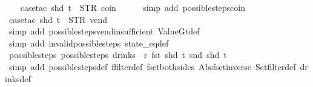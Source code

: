 \begin{isabellebody}
%
\isadelimproof
\ \ %
\endisadelimproof
%
\isatagproof
{}\isamarkupfalse%
\ {\isacharparenleft}case{\isacharunderscore}tac\ {\isachardoublequoteopen}shd\ t\ {\isacharequal}\ {\isacharparenleft}STR\ {\isacharprime}{\isacharprime}coin{\isacharprime}{\isacharprime}{\isacharcomma}\ {\isacharbrackleft}{\isacharbrackright}{\isacharparenright}{\isachardoublequoteclose}{\isacharparenright}\isanewline
\ \ \ \isamarkupfalse%
\ {\isacharparenleft}simp\ add{\isacharcolon}\ possible{\isacharunderscore}steps{\isacharunderscore}coin{\isacharparenright}\isanewline
\ \ \isamarkupfalse%
\ {\isacharparenleft}case{\isacharunderscore}tac\ {\isachardoublequoteopen}shd\ t\ {\isacharequal}\ {\isacharparenleft}STR\ {\isacharprime}{\isacharprime}vend{\isacharprime}{\isacharprime}{\isacharcomma}\ {\isacharbrackleft}{\isacharbrackright}{\isacharparenright}{\isachardoublequoteclose}{\isacharparenright}\isanewline
\ \ \ \isamarkupfalse%
\ {\isacharparenleft}simp\ add{\isacharcolon}\ possible{\isacharunderscore}steps{\isacharunderscore}vend{\isacharunderscore}insufficient\ ValueGt{\isacharunderscore}def{\isacharparenright}\isanewline
\ \ \isamarkupfalse%
\ {\isacharparenleft}simp\ add{\isacharcolon}\ invalid{\isacharunderscore}possible{\isacharunderscore}steps{\isacharunderscore}{}\ state_eq{\isacharunderscore}def{\isacharparenright}%
\endisatagproof
{\isafoldproof}%
%
\isadelimproof
\isanewline
%
\endisadelimproof
\isanewline
{}\isamarkupfalse%
\ possible{\isacharunderscore}steps{\isacharunderscore}{}{\isacharcolon}\ {\isachardoublequoteopen}possible{\isacharunderscore}steps\ drinks\ {}\ r\ {\isacharparenleft}fst\ {\isacharparenleft}shd\ t{\isacharparenright}{\isacharparenright}\ {\isacharparenleft}snd\ {\isacharparenleft}shd\ t{\isacharparenright}{\isacharparenright}\ {\isacharequal}\ {\isacharbraceleft}{\isacharbar}{\isacharbar}{\isacharbraceright}{\isachardoublequoteclose}\isanewline
%
\isadelimproof
\ \ %
\endisadelimproof
%
\isatagproof
{}\isamarkupfalse%
\ {\isacharparenleft}simp\ add{\isacharcolon}\ possible{\isacharunderscore}steps{\isacharunderscore}def\ ffilter{\isacharunderscore}def\ fset{\isacharunderscore}both{\isacharunderscore}sides\ Abs{\isacharunderscore}fset{\isacharunderscore}inverse\ Set{\isachardot}filter{\isacharunderscore}def\ drinks{\isacharunderscore}def{\isacharparenright}%
\endisatagproof
{\isafoldproof}%
%
\isadelimproof
\isanewline
%
\endisadelimproof
\isanewline
{}\isamarkupfalse%

\end{isabellebody}

